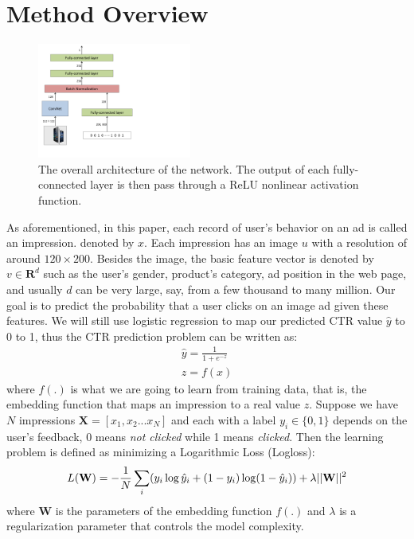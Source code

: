 \documentclass{sig-alternate-05-2015}
\begin{document}
\section{Method Overview}\label{Overview}
\begin{figure}
	\centering
	\includegraphics[width=0.45\textwidth]{pic}
	\caption{The overall architecture of the network. The output of each fully-connected layer is then pass through a ReLU nonlinear activation function.}
	\label{fig:net}
\end{figure}
As aforementioned,
in this paper, each record of user's behavior on an ad is called an impression. denoted by $x$. Each impression has an image $u$ with a resolution of around $120 \times 200$. Besides the image, the basic feature vector is denoted by $v \in \mathbf{R}^{d}$ such as the  user's gender, product's category, ad position in the web page, and usually $d$ can be very large, say, from a few thousand to many million.
Our goal is to predict the probability that a user clicks on an image ad given these features. We will still use logistic regression to map our predicted CTR value $\hat{y}$ to 0 to 1, thus the CTR prediction problem can be written as:
\begin{gather}
	\hat{y} = \frac{1}{1+e^{-z}} \\
	z = f(x)
\end{gather}
where $f(.)$ is what we are going to learn from training data, that is, the embedding function that maps an impression to a real value $z$.  Suppose we have $N$ impressions $\mathbf{X}=[x_{1}, x_{2}...x_{N}]$ and each with a label $y_{i} \in \{0,1\}$ depends on the user's feedback, 0 means \emph{not clicked} while 1 means \emph{clicked}. Then the learning problem is defined as minimizing a Logarithmic Loss (Logloss):
\begin{equation}
	L(\mathbf{W}) = -\frac{1}{N} \sum_{i} (y_{i} \log \hat{y}_{i} + (1-y_{i}) \log (1-\hat{y}_{i}) )  \\ + \lambda || \mathbf{W}||^{2}
\end{equation}
where $\mathbf{W}$ is the parameters of the embedding function $f(.) $ and $\lambda$ is a regularization parameter that controls the model complexity.
\end{document}
